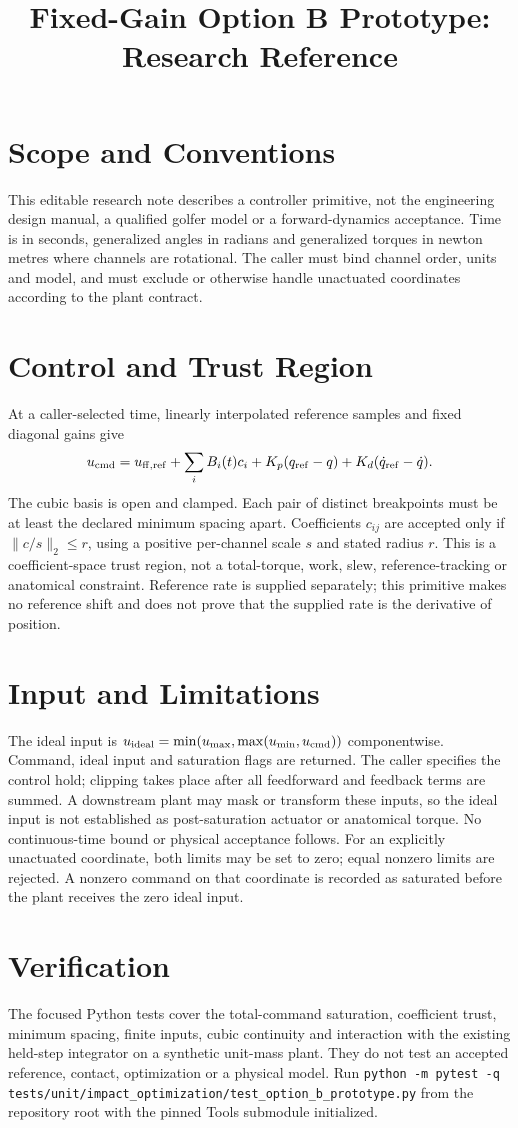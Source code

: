 \documentclass{article}
\title{Fixed-Gain Option B Prototype: Research Reference}
\begin{document}
\maketitle
\section{Scope and Conventions}
This editable research note describes a controller primitive, not the
engineering design manual, a qualified golfer model or a forward-dynamics
acceptance. Time is in seconds, generalized angles in radians and generalized
torques in newton metres where channels are rotational. The caller must bind
channel order, units and model, and must exclude or otherwise handle
unactuated coordinates according to the plant contract.

\section{Control and Trust Region}
At a caller-selected time, linearly interpolated reference samples and fixed
diagonal gains give
\[
 u_{\rm cmd}=u_{\rm ff,ref}+\sum_i B_i(t)c_i
 +K_p(q_{\rm ref}-q)+K_d(\dot q_{\rm ref}-\dot q).
\]
The cubic basis is open and clamped. Each pair of distinct breakpoints must
be at least the declared minimum spacing apart. Coefficients $c_{ij}$ are
accepted only if $\lVert c/s\rVert_2\le r$, using a positive per-channel scale
$s$ and stated radius $r$. This is a coefficient-space trust region, not a
total-torque, work, slew, reference-tracking or anatomical constraint.
Reference rate is supplied separately; this primitive makes no reference
shift and does not prove that the supplied rate is the derivative of position.

\section{Input and Limitations}
The ideal input is $u_{\rm ideal}=\min(u_{\max},\max(u_{\min},u_{\rm cmd}))$
componentwise. Command, ideal input and saturation flags are returned. The
caller specifies the control hold; clipping takes place after all feedforward
and feedback terms are summed. A downstream plant may mask or transform these
inputs, so the ideal input is not established as post-saturation actuator or
anatomical torque. No continuous-time bound or physical acceptance follows.
For an explicitly unactuated coordinate, both limits may be set to zero;
equal nonzero limits are rejected. A nonzero command on that coordinate is
recorded as saturated before the plant receives the zero ideal input.

\section{Verification}
The focused Python tests cover the total-command saturation, coefficient trust,
minimum spacing, finite inputs, cubic continuity and interaction with the
existing held-step integrator on a synthetic unit-mass plant. They do not test
an accepted reference, contact, optimization or a physical model. Run
\texttt{python -m pytest -q tests/unit/impact\_optimization/test\_option\_b\_prototype.py}
from the repository root with the pinned Tools submodule initialized.
\end{document}
